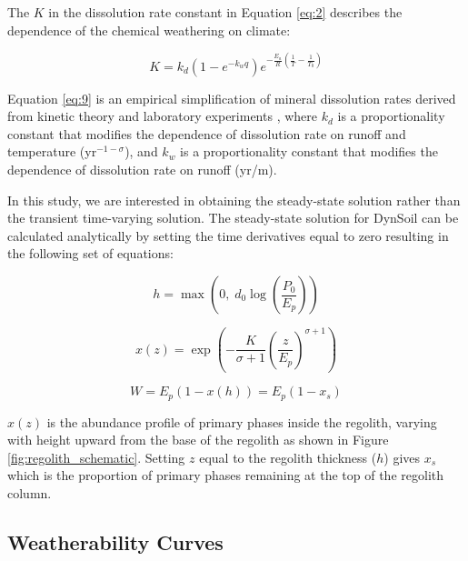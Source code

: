 \documentclass[9pt,twocolumn,twoside,lineno]{pnas-new}
\begin{document}
{The $K$ in the dissolution rate constant in Equation \ref{eq:2} describes the dependence of the chemical weathering on climate:

\begin{equation}
    K = k_{d}\left(1-e^{-k_{w}q}\right)e^{-\frac{E_{a}}{R}\left(\frac{1}{T}-\frac{1}{T_{0}}\right)}
    \label{eq:9}
\end{equation}

\noindent
Equation \ref{eq:9} is an empirical simplification of mineral dissolution rates derived from kinetic theory and laboratory experiments \cite{West2012a}, where $k_{d}$ is a proportionality constant that modifies the dependence of dissolution rate on runoff and temperature (yr$^{-1-\sigma}$), and $k_{w}$ is a proportionality constant that modifies the dependence of dissolution rate on runoff (yr/m).

In this study, we are interested in obtaining the steady-state solution rather than the transient time-varying solution. The steady-state solution for DynSoil can be calculated analytically by setting the time derivatives equal to zero resulting in the following set of equations:

\begin{equation}
    h = \max\left(0,\;d_{0} \log\left(\frac{P_{0}}{E_{p}}\right)\right)
    \label{eq:10}
\end{equation}

\begin{equation}
    x(z) = \exp\left(-\frac{K}{\sigma+1}\left(\frac{z}{E_{p}}\right)^{\sigma+1}\right)
    \label{eq:11}
\end{equation}

\begin{equation}
    W = E_{p}(1-x(h)) = E_{p}(1-x_s)
    \label{eq:12}
\end{equation}

\noindent
$x(z)$ is the abundance profile of primary phases inside the regolith, varying with height upward from the base of the regolith as shown in Figure \ref{fig:regolith_schematic}. Setting $z$ equal to the regolith thickness ($h$) gives $x_s$ which is the proportion of primary phases remaining at the top of the regolith column.

\subsection*{Weatherability Curves}

}
\end{document}
